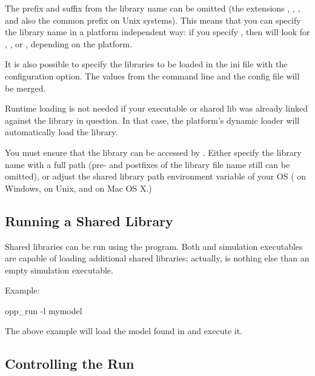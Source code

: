 The prefix and suffix from the library name can be omitted (the extensions
, , , and also the common  prefix
on Unix systems). This means that you can specify the library name in a
platform independent way: if you specify , then {\opp} will
look for , ,  or ,
depending on the platform.

It is also possible to specify the libraries to be loaded in the ini file
with the  configuration option. The values from the command line
and the config file will be merged.

\begin{note}
  Runtime loading is not needed if your executable or shared lib was
  already linked against the library in question. In that case,
  the platform's dynamic loader will automatically load the library.
\end{note}

\begin{note}
  You must ensure that the library can be accessed by {\opp}. Either specify the
  library name with a full path (pre- and postfixes of the library file name
  still can be omitted), or adjust the shared library path environment variable
  of your OS ( on Windows,  on Unix, and
   on Mac OS X.)
\end{note}

\subsection{Running a Shared Library}
\label{sec:run-sim:running-shared-lib}

Shared libraries can be run using the  program.
Both  and simulation executables are capable of
loading additional shared libraries; actually, 
is nothing else than an empty simulation executable.

Example:
\begin{commandline}
opp_run -l mymodel
\end{commandline}

The above example will load the model found in  and execute it.

\subsection{Controlling the Run}
\label{sec:run-sim:controlling-the-run}

